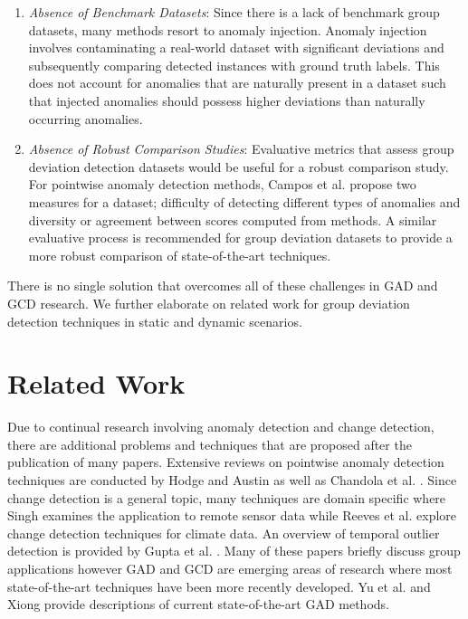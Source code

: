 \begin{enumerate}[\textbullet]
\item {\it Absence of Benchmark Datasets}: Since there is a lack of benchmark group datasets, many methods resort to anomaly injection. Anomaly injection involves contaminating a real-world dataset with significant deviations and subsequently comparing detected instances with  ground truth labels. This does not account for  anomalies that are naturally present in a dataset such that injected anomalies should possess higher deviations than naturally occurring anomalies. 
\item {\it Absence of Robust Comparison Studies}: Evaluative metrics that assess  group deviation detection datasets would be useful for a robust comparison study. For pointwise anomaly detection methods, Campos et al. \cite{Campos2016} propose two measures for a dataset; difficulty of detecting different types of anomalies and diversity or agreement between scores computed from methods.  A similar evaluative process is recommended for group deviation datasets to provide a more robust comparison of state-of-the-art techniques. 
\end{enumerate}
There is no single solution that overcomes all of these challenges in GAD and GCD research.  We further elaborate on related work for group deviation detection techniques in static and dynamic scenarios. 


\section{Related Work}
Due to continual research involving  anomaly detection and change detection,  there are additional problems and  techniques that are proposed after the publication of many papers. Extensive reviews on pointwise anomaly detection techniques are conducted by Hodge and  Austin \cite{Hodge}  as well as Chandola et al. \cite{Chandola}.   Since change detection is a general topic, many techniques are domain specific where  
Singh \cite{singh1989review} examines the application to remote sensor data while Reeves et al. \cite{reeves2007review} explore change detection techniques for climate data. An overview of temporal outlier detection is provided by Gupta et al. \cite{Gupta2013}. Many of these papers  briefly discuss  group applications however GAD and GCD are emerging areas of research where most state-of-the-art techniques have been more recently developed.  Yu et al. \cite{SurveySocialMedia} and  Xiong \cite{Collective}  provide descriptions of current state-of-the-art GAD methods.  %

